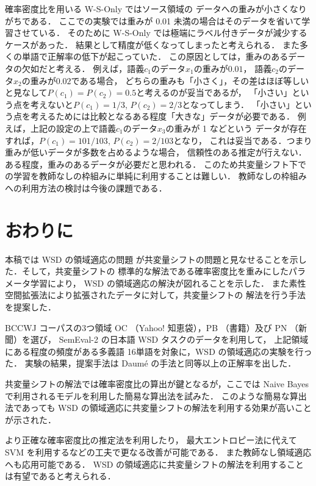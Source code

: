 \documentclass[japanese]{jnlp_1.4}
\begin{document}
確率密度比を用いる W-S-Only ではソース領域の
データへの重みが小さくなりがちである．
ここでの実験では重みが 0.01 未満の場合はそのデータを省いて学習させている．
そのために W-S-Only では極端にラベル付きデータが減少するケースがあった．
結果として精度が低くなってしまったと考えられる．
また多くの単語で正解率の低下が起こっていた．
この原因としては，重みのあるデータの欠如だと考える．
例えば，語義\( c_1 \)のデータ\( x_1 \)の重みが\( 0.01 \)，
語義\( c_2 \)のデータ\( x_2 \)の重みが\( 0.02 \)である場合，
どちらの重みも「小さく」，その差はほぼ等しいと見なして\( P(c_1) = P(c_2) = 0.5 \)と考えるのが妥当であるが，
「小さい」という点を考えないと\( P(c_1) = 1/3\), \(P(c_2) = 2/3 \)となってしまう．
「小さい」という点を考えるためには比較となるある程度「大きな」データが必要である．
例えば，上記の設定の上で語義\( c_1 \)のデータ\( x_3 \)の重みが 1 などという
データが存在すれば，\( P(c_1) = 101/103\), \(P(c_2) = 2/103 \)となり，
これは妥当である．つまり重みが低いデータが多数を占めるような場合，
信頼性のある推定が行えない．ある程度，重みのあるデータが必要だと思われる．
このため共変量シフト下での学習を教師なしの枠組みに単純に利用することは難しい．
教師なしの枠組みへの利用方法の検討は今後の課題である．


\section{おわりに}

本稿では WSD の領域適応の問題
が共変量シフトの問題と見なせることを示した．そして，共変量シフトの
標準的な解法である確率密度比を重みにしたパラメータ学習により，
WSD の領域適応の解決が図れることを示した．
また素性空間拡張法により拡張されたデータに対して，共変量シフトの
解法を行う手法を提案した．

BCCWJ コーパスの3つ領域 OC （Yahoo! 知恵袋），PB （書籍）及び PN （新聞）を選び，
SemEval-2 の日本語 WSD タスクのデータを利用して，
上記領域にある程度の頻度がある多義語 16単語を対象に，WSD の領域適応の実験を行った．
実験の結果，提案手法は Daum{\'e} の手法と同等以上の正解率を出した．

共変量シフトの解法では確率密度比の算出が鍵となるが，ここでは Naive
Bayes で利用されるモデルを利用した簡易な算出法を試みた．
このような簡易な算出法であっても
WSD の領域適応に共変量シフトの解法を利用する効果が高いことが示された．

より正確な確率密度比の推定法を利用したり，
最大エントロピー法に代えてSVM を利用するなどの工夫で更なる改善が可能である．
また教師なし領域適応へも応用可能である．
WSD の領域適応に共変量シフトの解法を利用することは有望であると考えられる．
\end{document}
